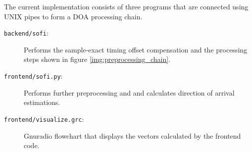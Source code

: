 The current implementation consists of three
programs that are connected using UNIX pipes
to form a DOA processing chain. \\

\begin{description}
  \item[\texttt{backend/sofi}:] Performs the sample-exact
    timing offset compensation and the processing steps
    shown in figure \ref{img:preprocessing_chain}.

  \item[\texttt{frontend/sofi.py}:] Performs further preprocessing
    and and calculates direction of arrival estimations.

  \item[\texttt{frontend/visualize.grc}:] Gnuradio flowchart
    that displays the vectors calculated by the frontend code.
\end{description}

